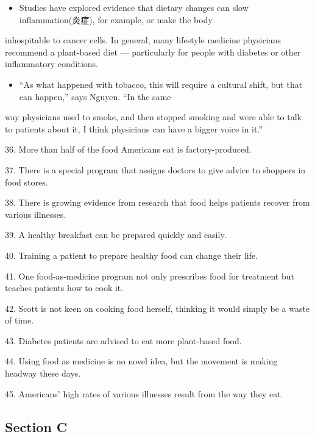 \documentclass[UTF8,11pt]{ctexart}
\begin{document}
\begin{itemize}[leftmargin=2em,itemsep=.2em,topsep=.4em]\item[J.] Studies have explored evidence that dietary changes can slow inflammation(炎症), for example, or make the body
\end{itemize}

inhospitable to cancer cells. In general, many lifestyle medicine physicians recommend a plant-based diet — particularly for people with diabetes or other inflammatory conditions.


\begin{itemize}[leftmargin=2em,itemsep=.2em,topsep=.4em]\item[K.] “As what happened with tobacco, this will require a cultural shift, but that can happen,” says Nguyen. “In the same
\end{itemize}

way physicians used to smoke, and then stopped smoking and were able to talk to patients about it, I think physicians can have a bigger voice in it.”


36. More than half of the food Americans eat is factory-produced.


37. There is a special program that assigns doctors to give advice to shoppers in food stores.


38. There is growing evidence from research that food helps patients recover from various illnesses.


39. A healthy breakfast can be prepared quickly and easily.


40. Training a patient to prepare healthy food can change their life.


41. One food-as-medicine program not only prescribes food for treatment but teaches patients how to cook it.


42. Scott is not keen on cooking food herself, thinking it would simply be a waste of time.


43. Diabetes patients are advised to eat more plant-based food.


44. Using food as medicine is no novel idea, but the movement is making headway these days.


45. Americans’ high rates of various illnesses result from the way they eat.


\subsection*{\textbf{Section C}}
\end{document}
